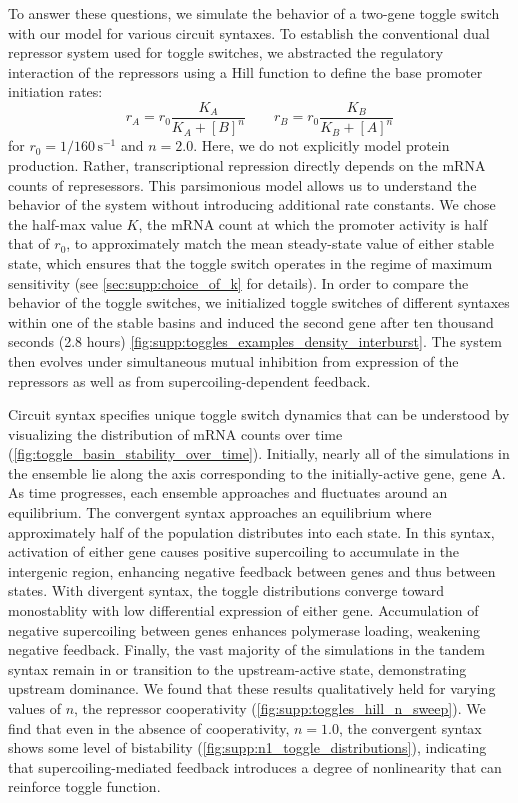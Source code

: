 \documentclass[11pt]{article}
\begin{document}
To answer these questions, we simulate the behavior of a two-gene toggle switch with our model for various circuit syntaxes. To establish the conventional dual repressor system used for toggle switches, we abstracted the regulatory interaction of the repressors using a Hill function to define the base promoter initiation rates:
\begin{equation}
    r_A = r_0 \frac{K_A}{K_A + [B]^n} \qquad r_B = r_0 \frac{K_B}{K_B + [A]^n}
\end{equation}
for \(r_0 = 1/160 \,\text{s}^{-1}\) and \(n = 2.0\). Here, we do not explicitly model protein production. Rather, transcriptional repression directly depends on the mRNA counts of represessors. This parsimonious model allows us to understand the behavior of the system without introducing additional rate constants. We chose the half-max value \(K\), the mRNA count at which the promoter activity is half that of \(r_0\), to approximately match the mean steady-state value of either stable state, which ensures that the toggle switch operates in the regime of maximum sensitivity (see \cref{sec:supp:choice_of_k} for details). In order to compare the behavior of the toggle switches, we initialized toggle switches of different syntaxes within one of the stable basins and induced the second gene after ten thousand seconds (2.8 hours) \cref{fig:supp:toggles_examples_density_interburst}. The system then evolves under simultaneous mutual inhibition from expression of the repressors as well as from supercoiling-dependent feedback.

Circuit syntax specifies unique toggle switch dynamics that can be understood by visualizing the distribution of mRNA counts over time (\cref{fig:toggle_basin_stability_over_time}). Initially, nearly all of the simulations in the ensemble lie along the axis corresponding to the initially-active gene, gene A. As time progresses, each ensemble approaches and fluctuates around an equilibrium.
The convergent syntax approaches an equilibrium where approximately half of the population distributes into each state. In this syntax, activation of either gene causes positive supercoiling to accumulate in the intergenic region, enhancing negative feedback between genes and thus between states. With divergent syntax, the toggle distributions converge toward monostablity with low differential expression of either gene. Accumulation of negative supercoiling between genes enhances polymerase loading, weakening negative feedback. Finally, the vast majority of the simulations in the tandem syntax remain in or transition to the upstream-active state, demonstrating upstream dominance. We found that these results qualitatively held for varying values of \(n\), the repressor cooperativity (\cref{fig:supp:toggles_hill_n_sweep}). We find that  even in the absence of cooperativity, \(n = 1.0\), the convergent syntax shows some level of bistability (\cref{fig:supp:n1_toggle_distributions}), indicating that supercoiling-mediated feedback introduces a degree of nonlinearity that can reinforce toggle function. 
\end{document}
